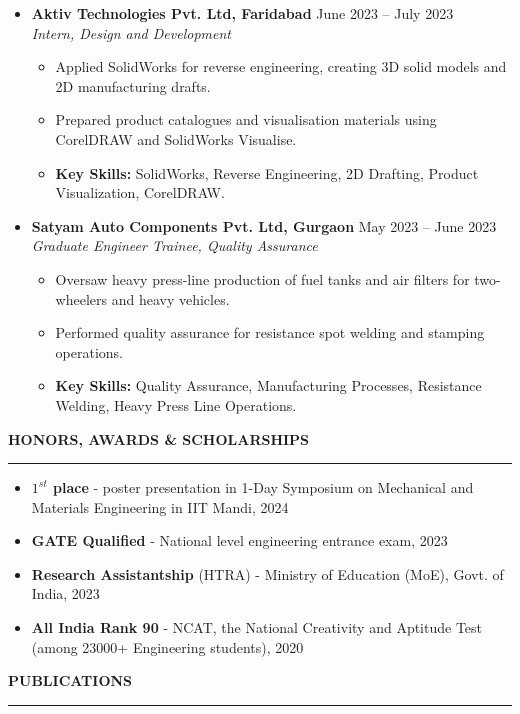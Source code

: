 \documentclass[letterpaper,10pt]{article}
\newcommand{\sectionline}[1]{%
    \vspace{0.7em}%
    \textbf{\large #1} \vspace{-2.0em}\\%
    
    \rule{\textwidth}{0.5pt}%
    \vspace{0.25em}%
}
\begin{document}
\begin{itemize}[leftmargin=*]
    \item \textbf{Aktiv Technologies Pvt. Ltd, Faridabad} \hfill June 2023 -- July 2023\\
        \textit{Intern, Design and Development}
        \begin{itemize}[nosep]
            \item Applied SolidWorks for reverse engineering, creating 3D solid models and 2D manufacturing drafts.
            \item Prepared product catalogues and visualisation materials using CorelDRAW and SolidWorks Visualise.
            \item \textbf{Key Skills:} SolidWorks, Reverse Engineering, 2D Drafting, Product Visualization, CorelDRAW.
        \end{itemize}
    \vspace{0.5em}
    
    \item \textbf{Satyam Auto Components Pvt. Ltd, Gurgaon} \hfill May 2023 -- June 2023\\
        \textit{Graduate Engineer Trainee, Quality Assurance}
        \begin{itemize}[nosep]
            \item Oversaw heavy press-line production of fuel tanks and air filters for two-wheelers and heavy vehicles.
            \item Performed quality assurance for resistance spot welding and stamping operations.
            \item \textbf{Key Skills:} Quality Assurance, Manufacturing Processes, Resistance Welding, Heavy Press Line Operations.
        \end{itemize}
\end{itemize}


\sectionline{HONORS, AWARDS \& SCHOLARSHIPS}

\begin{itemize}
    \item \textbf{$1^{st}$ place} - poster presentation in 1-Day Symposium on Mechanical and Materials Engineering in IIT Mandi, 2024
    \item \textbf{GATE Qualified } - National level engineering entrance exam, 2023
    \item \textbf{Research Assistantship} (HTRA) - Ministry of Education (MoE), Govt. of India, 2023
    \item \textbf{All India Rank 90} - NCAT, the National Creativity and Aptitude Test (among 23000+ Engineering students), 2020

\end{itemize}
\sectionline{PUBLICATIONS}
\end{document}
